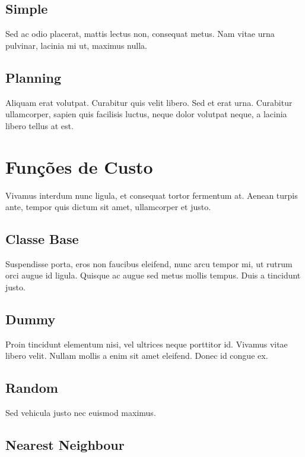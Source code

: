 \subsection{Simple}

Sed ac odio placerat, mattis lectus non, consequat metus. Nam vitae urna
pulvinar, lacinia mi ut, maximus nulla.

\subsection{Planning}

Aliquam erat volutpat. Curabitur quis velit libero.
Sed et erat urna. Curabitur ullamcorper, sapien quis facilisis luctus, neque
dolor volutpat neque, a lacinia libero tellus at est.

\section{Funções de Custo}

Vivamus interdum nunc ligula, et consequat tortor fermentum at. Aenean turpis
ante, tempor quis dictum sit amet, ullamcorper et justo.

\subsection{Classe Base}

Suspendisse porta, eros non faucibus eleifend, nunc arcu tempor mi, ut rutrum
orci augue id ligula. Quisque ac augue sed metus mollis tempus. Duis a tincidunt
justo.

\subsection{Dummy}

Proin tincidunt elementum nisi, vel ultrices neque porttitor id. Vivamus vitae
libero velit. Nullam mollis a enim sit amet eleifend. Donec id congue ex.

\subsection{Random}

Sed vehicula justo nec euismod maximus.

\subsection{Nearest Neighbour}

